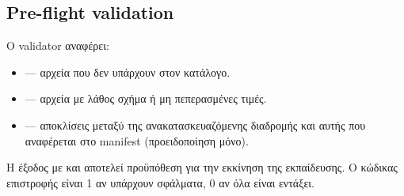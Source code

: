 \subsection*{Pre-flight validation}

Ο validator αναφέρει:
\begin{itemize}
  \item {} — αρχεία που δεν υπάρχουν στον κατάλογο.
  \item {} — αρχεία με λάθος σχήμα ή μη πεπερασμένες τιμές.
  \item {} — αποκλίσεις μεταξύ της ανακατασκευαζόμενης
    διαδρομής και αυτής που αναφέρεται στο manifest (προειδοποίηση μόνο).
\end{itemize}

Η έξοδος με  και  αποτελεί
προϋπόθεση για την εκκίνηση της εκπαίδευσης.
Ο κώδικας επιστροφής είναι 1 αν υπάρχουν σφάλματα, 0 αν όλα είναι εντάξει.
